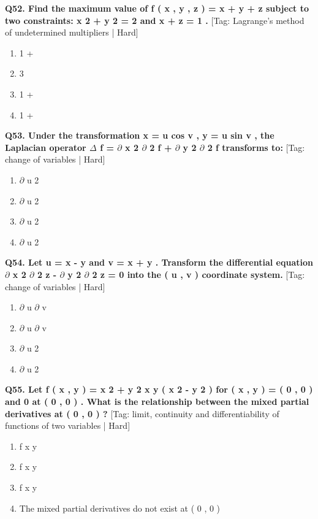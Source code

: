 \noindent\textbf{Q52. Find the maximum value of f ( x , y , z ) = x + y + z subject to two constraints: x 2 + y 2 = 2 and x + z = 1 .} \hfill [Tag: Lagrange's method of undetermined multipliers | Hard]
\begin{enumerate}[label=(\alph*),topsep=2pt,itemsep=1pt,partopsep=0pt,parsep=0pt]
    \item {{1 +}}
    \item {{3}}
    \item {{1 +}}
    \item {{1 +}}
\end{enumerate}
\vspace{2mm}

\noindent\textbf{Q53. Under the transformation x = u cos v , y = u sin v , the Laplacian operator $\Delta$ f = $\partial$ x 2 $\partial$ 2 f + $\partial$ y 2 $\partial$ 2 f transforms to:} \hfill [Tag: change of variables | Hard]
\begin{enumerate}[label=(\alph*),topsep=2pt,itemsep=1pt,partopsep=0pt,parsep=0pt]
    \item {{$\partial$ u 2}}
    \item {{$\partial$ u 2}}
    \item {{$\partial$ u 2}}
    \item {{$\partial$ u 2}}
\end{enumerate}
\vspace{2mm}

\noindent\textbf{Q54. Let u = x - y and v = x + y . Transform the differential equation $\partial$ x 2 $\partial$ 2 z - $\partial$ y 2 $\partial$ 2 z = 0 into the ( u , v ) coordinate system.} \hfill [Tag: change of variables | Hard]
\begin{enumerate}[label=(\alph*),topsep=2pt,itemsep=1pt,partopsep=0pt,parsep=0pt]
    \item {{$\partial$ u $\partial$ v}}
    \item {{$\partial$ u $\partial$ v}}
    \item {{$\partial$ u 2}}
    \item {{$\partial$ u 2}}
\end{enumerate}
\vspace{2mm}

\noindent\textbf{Q55. Let f ( x , y ) = x 2 + y 2 x y ( x 2 - y 2 ) for ( x , y )  = ( 0 , 0 ) and 0 at ( 0 , 0 ) . What is the relationship between the mixed partial derivatives at ( 0 , 0 ) ?} \hfill [Tag: limit, continuity and differentiability of functions of two variables | Hard]
\begin{enumerate}[label=(\alph*),topsep=2pt,itemsep=1pt,partopsep=0pt,parsep=0pt]
    \item {{f x y}}
    \item {{f x y}}
    \item {{f x y}}
    \item {{The mixed partial derivatives do not exist at ( 0 , 0 )}}
\end{enumerate}
\vspace{2mm}

